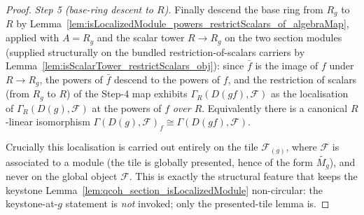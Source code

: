 \begin{proof}
  \emph{Step 5 (base-ring descent to \(R\)).} Finally descend the base ring from \(R_g\) to \(R\) by
  Lemma~\ref{lem:isLocalizedModule_powers_restrictScalars_of_algebraMap}, applied with \(A = R_g\) and the
  scalar tower \(R \to R_g\) on the two section modules (supplied structurally on the bundled
  restriction-of-scalars carriers by Lemma~\ref{lem:isScalarTower_restrictScalars_obj}): since \(\bar f\) is the image of \(f\) under
  \(R \to R_g\), the powers of \(\bar f\) descend to the powers of \(f\), and the restriction of scalars
  (from \(R_g\) to \(R\)) of the Step-4 map exhibits \(\Gamma_R(D(gf), \mathcal{F})\) as the localisation
  of \(\Gamma_R(D(g), \mathcal{F})\) at the powers of \(f\) \emph{over \(R\)}. Equivalently there is a
  canonical \(R\)-linear isomorphism \(\Gamma(D(g), \mathcal{F})_f \cong \Gamma(D(gf), \mathcal{F})\).

  Crucially this localisation is carried out entirely on the tile \(\mathcal{F}_{(g)}\), where
  \(\mathcal{F}\) is associated to a module (the tile is globally presented, hence of the form
  \(\widetilde{M_g}\)), and never on
  the global object \(\mathcal{F}\). This is exactly the structural feature that keeps the keystone
  Lemma~\ref{lem:qcoh_section_isLocalizedModule} non-circular: the keystone-at-\(g\) statement is
  \emph{not} invoked; only the presented-tile lemma is.
\end{proof}


